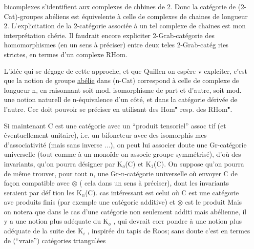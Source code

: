 
 bicomplexes s'identifient aux complexes de chhines  de  2.
Donc la catégorie de (2-Cat)-groupes abéliens est équivelente à celle de
complexes de chaines de longueur 2. L'explicitation de la 2-catégorie
associée à un tel complexe de chaines est mon interprétation chérie. Il
faudrait encore expliciter   2-Grab-catégorie  des
homomorphismes (en un sens à préciser) entre deux teles  2-Grab-catég
ries strictes, en termes d'un complexe RHom.

L'idée qui se dégage de cette approche, et que Quillen on espère v
explciter, c'est que la  notion de groupe \uline{abélie}
dans (n-Cat) correspond à celle de complexe de  longueur n, en raisonnant
soit mod. isomorphisme de part et d'autre, soit mod. une notion naturell
de n-équivalence d'un côté, et dans la catégorie dérivée de l'autre. Cec
doit pouvoir se préciser en utilisant des Hom$^{\bullet}$ resp. des RHom$^{\bullet}$.

Si maintenant C est une catégorie avec un ``produit tensoriel'' assoc
tif (et éventuellement unitaire), i.e. un bifoncteur avec des isomorphis
mes d'associativité (mais sans inverse ...), on peut lui associer 
doute une  Gr-catégorie universelle (tout comme à un monoïde on associe
groupe symmétrisé), d'où des invariants, qu'on pourra désigner par K$_{o}$(C)
et K$_{1}$(C). On suppose qu'on pourra de même trouver, pour tout n, une
Gr-n-catégorie universelle où envoyer C de façon compatible avec $\otimes$ (
cela dans un sens à préciser), dont les invariants   seraient par déf
tion les K$_{n}$(C).  cas intéressant est celui où C est une catégorie ave
produits finis (par exemple une catégorie additive) et $\otimes$ est le produit\unsure{;}
\over{(}{[}Mais on notera que dans le cas d'une catégorie non seulement additi
mais abélienne, il y a une notion plus adéquate du K$_{o}$ , qui devrait corr
pondre à une notion plus adéquate de la suite des K$_{i}$ , inspirée du tapis
de Roos; sans doute c'est en termes de (``vraie'') catégories triangulées

